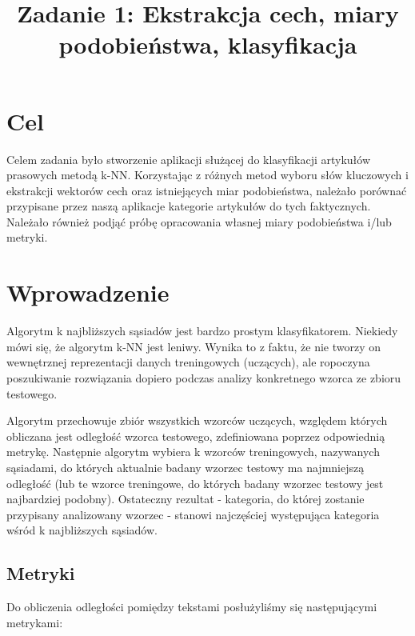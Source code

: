 \documentclass{classrep}
\author{
\studentinfo{Mateusz Walczak}{216911} \and
\studentinfo{Konrad Kajszczak}{216790}
}
\title{Zadanie 1: Ekstrakcja cech, miary podobieństwa, klasyfikacja}
\begin{document}
\maketitle

\section{Cel}
{Celem zadania było stworzenie aplikacji służącej do klasyfikacji artykułów prasowych metodą k-NN. Korzystając z różnych metod
wyboru słów kluczowych i ekstrakcji wektorów cech oraz istniejących miar podobieństwa, należało porównać przypisane przez naszą aplikacje kategorie artykułów do tych faktycznych. Należało również podjąć próbę opracowania własnej miary podobieństwa i/lub metryki.}

\section{Wprowadzenie}
 Algorytm k najbliższych sąsiadów jest bardzo prostym klasyfikatorem. Niekiedy mówi się, że algorytm k-NN jest leniwy. Wynika to z faktu, że nie tworzy on wewnętrznej reprezentacji danych treningowych (uczących), ale ropoczyna poszukiwanie rozwiązania dopiero podczas analizy konkretnego wzorca ze zbioru testowego. \newline

Algorytm przechowuje zbiór wszystkich wzorców uczących, względem których obliczana jest odległość wzorca testowego, zdefiniowana poprzez odpowiednią metrykę. Następnie algorytm wybiera k wzorców treningowych, nazywanych sąsiadami, do których aktualnie badany wzorzec testowy ma najmniejszą odległość (lub te wzorce treningowe, do których badany wzorzec testowy jest najbardziej podobny). Ostateczny rezultat - kategoria, do której zostanie przypisany analizowany wzorzec - stanowi najczęściej występująca kategoria wśród k najbliższych sąsiadów.

\subsection{Metryki}

Do obliczenia odległości pomiędzy tekstami posłużyliśmy się następującymi metrykami:
\end{document}
